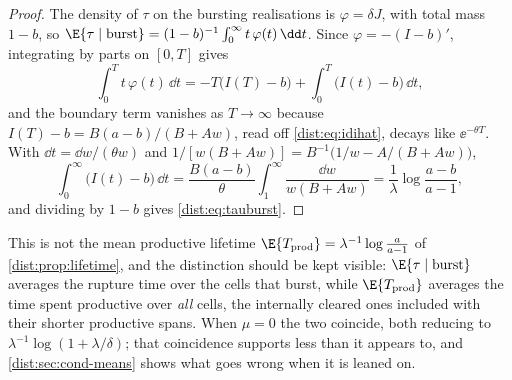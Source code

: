 \begin{proof}
The density of $\tau$ on the bursting realisations is $\varphi=\delta J$, with
total mass $1-b$, so
$\E{\tau\mid\text{burst}}=(1-b)^{-1}\int_0^\infty t\,\varphi(t)\,\dd t$.
Since $\varphi=-(I-b)'$, integrating by parts on $[0,T]$ gives
\[
\int_0^T t\,\varphi(t)\,\dd t
=-T\bigl(I(T)-b\bigr)+\int_0^T\bigl(I(t)-b\bigr)\,\dd t,
\]
and the boundary term vanishes as $T\to\infty$ because
$I(T)-b=B(a-b)/(B+Aw)$, read off \cref{dist:eq:idihat}, decays like
$\ee^{-\theta T}$. With $\dd t=\dd w/(\theta w)$ and
$1/[w(B+Aw)]=B^{-1}\bigl(1/w-A/(B+Aw)\bigr)$,
\[
\int_0^\infty\bigl(I(t)-b\bigr)\,\dd t
=\frac{B(a-b)}{\theta}\int_1^\infty\frac{\dd w}{w(B+Aw)}
=\frac{1}{\lambda}\log\frac{a-b}{a-1},
\]
and dividing by $1-b$ gives \cref{dist:eq:tauburst}.
\end{proof}

This is not the mean productive lifetime
$\E{T_{\rm prod}}=\lambda^{-1}\log\frac{a}{a-1}$ of
\cref{dist:prop:lifetime}, and the distinction should be kept visible:
$\E{\tau\mid\text{burst}}$ averages the rupture time over the cells that
burst, while $\E{T_{\rm prod}}$ averages the time spent productive over
\emph{all} cells, the internally cleared ones included with their shorter
productive spans. When $\mu=0$ the two coincide, both reducing to
$\lambda^{-1}\log(1+\lambda/\delta)$; that coincidence supports less than it
appears to, and \cref{dist:sec:cond-means} shows what goes wrong when it is
leaned on.

